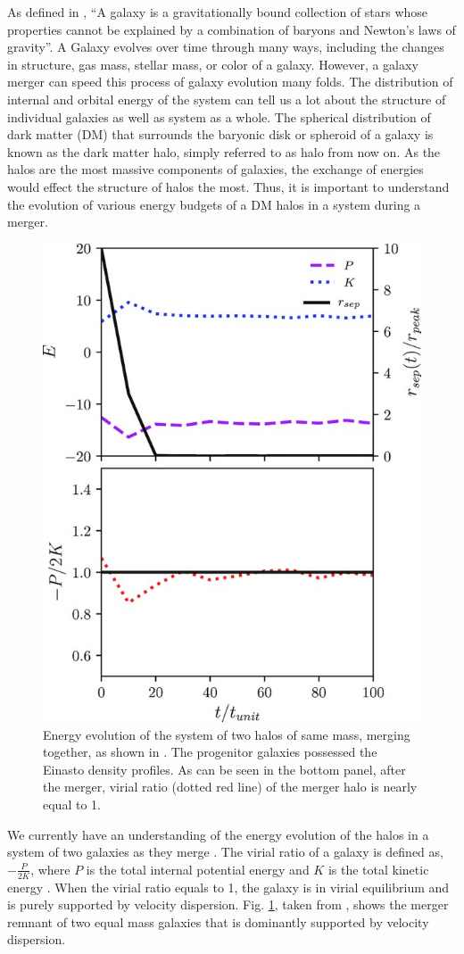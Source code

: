 \documentclass[twocolumn]{aastex631}
\begin{document}
As defined in \cite{galaxy_def}, ``A galaxy is a gravitationally bound collection of stars whose properties cannot be explained by a combination of baryons and Newton’s laws of gravity''. A Galaxy evolves over time through many ways, including the changes in structure, gas mass, stellar mass, or color of a galaxy. However, a galaxy merger can speed this process of galaxy evolution many folds. The distribution of internal and orbital energy of the system can tell us a lot about the structure of individual galaxies as well as system as a whole. The spherical distribution of dark matter (DM) that surrounds the baryonic disk or spheroid of a galaxy is known as the dark matter halo, simply referred to as halo from now on. As the halos are the most massive components of galaxies, the exchange of energies would effect the structure of halos the most. Thus, it is important to understand the evolution of various energy budgets of a DM halos in a system during a merger. 

\begin{figure}[htbp]
\includegraphics[width=.5\textwidth]{two_galaxy_merger.jpg}
\caption{Energy evolution of the system of two halos of same mass, merging together, as shown in \cite{same_mass_merger_1}. The progenitor galaxies possessed the Einasto density profiles. As can be seen in the bottom panel, after the merger, virial ratio (dotted red line) of the merger halo is nearly equal to 1.\label{fig:virial}}
\end{figure}

 We currently have an understanding of the energy evolution of the halos in a system of two galaxies as they merge \citep[e.g.][]{same_mass_merger_1, same_mass_merger_2}. The virial ratio of a galaxy is defined as, $- \frac{P}{2K}$, where $P$ is the total internal potential energy and $K$ is the total kinetic energy \citep{same_mass_merger_1}. When the virial ratio equals to 1, the galaxy is in virial equilibrium and is purely supported by velocity dispersion. Fig. \ref{fig:virial}, taken from \cite{same_mass_merger_1}, shows the merger remnant of two equal mass galaxies that is dominantly supported by velocity dispersion.
\end{document}
